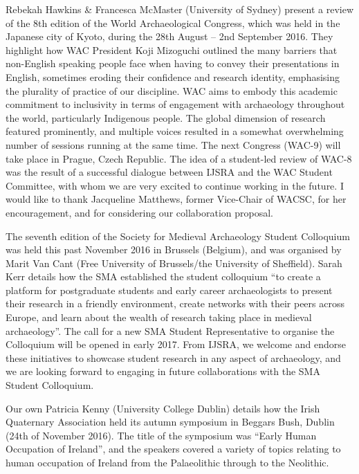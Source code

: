 Rebekah Hawkins \& Francesca McMaster (University of Sydney) present a review of the 8th edition of the World Archaeological Congress, which was held in the Japanese city of Kyoto, during the 28th August – 2nd September 2016. They highlight how WAC President Koji Mizoguchi outlined the many barriers that non-English speaking people face when having to convey their presentations in English, sometimes eroding their confidence and research identity, emphasising the plurality of practice of our discipline. WAC aims to embody this academic commitment to inclusivity in terms of engagement with archaeology throughout the world, particularly Indigenous people. The global dimension of research featured prominently, and multiple voices resulted in a somewhat overwhelming number of sessions running at the same time. The next Congress (WAC-9) will take place in Prague, Czech Republic. The idea of a student-led review of WAC-8 was the result of a successful dialogue between IJSRA and the WAC Student Committee, with whom we are very excited to continue working in the future. I would like to thank Jacqueline Matthews, former Vice-Chair of WACSC, for her encouragement, and for considering our collaboration proposal.

The seventh edition of the Society for Medieval Archaeology Student Colloquium was held this past November 2016 in Brussels (Belgium), and was organised by Marit Van Cant (Free University of Brussels/the University of Sheffield). Sarah Kerr details how the SMA established the student colloquium “to create a platform for postgraduate students and early career archaeologists to present their research in a friendly environment, create networks with their peers across Europe, and learn about the wealth of research taking place in medieval archaeology”. The call for a new SMA Student Representative to organise the Colloquium will be opened in early 2017.  From IJSRA, we welcome and endorse these initiatives to showcase student research in any aspect of archaeology, and we are looking forward to engaging in future collaborations with the SMA Student Colloquium.

Our own Patricia Kenny (University College Dublin) details how the Irish Quaternary Association held its autumn symposium in Beggars Bush, Dublin (24th of November 2016). The title of the symposium was “Early Human Occupation of Ireland”, and the speakers covered a variety of topics relating to human occupation of Ireland from the Palaeolithic through to the Neolithic.

\IJSRAseparator

